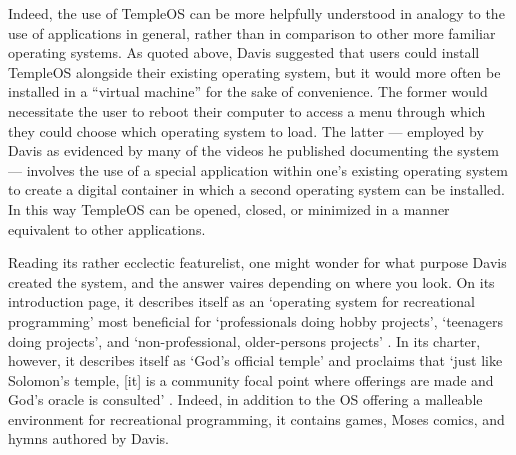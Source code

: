 \documentclass[Draft.tex]{subfiles}
\begin{document}

Indeed, the use of TempleOS can be more helpfully understood in
analogy to the use of applications in general, rather than
in comparison to other more familiar operating systems.
As quoted above, Davis suggested that users could install TempleOS
alongside their existing operating system, but it would more often
be installed in a ``virtual machine'' for the sake of convenience.
The former would necessitate the user to reboot their computer
to access a menu through which they could choose which operating system to
load.
The latter --- employed by Davis as evidenced by many of the
videos he published documenting the system --- involves the use of a special
application within one's existing operating system to create a digital container
in which a second operating system can be installed.
In this way TempleOS can be opened, closed, or minimized in a manner
equivalent to other applications.

Reading its rather ecclectic featurelist, one might wonder for what purpose
Davis created the system, and the answer vaires depending on where you look.
On its introduction page, it describes itself as
an `operating system for recreational programming' most beneficial for
`professionals doing hobby projects', `teenagers doing projects',
and `non-professional, older-persons projects'
\parencite{Welcome}.
In its charter, however, it describes itself as `God's official temple'
and proclaims that
`just like Solomon’s temple, [it] is a community focal point
where offerings are made and God’s oracle is consulted'
\parencite{Charter}.
Indeed, in addition to the OS offering
a malleable environment for recreational programming,
it contains games, Moses comics, and hymns authored by Davis.
\end{document}
